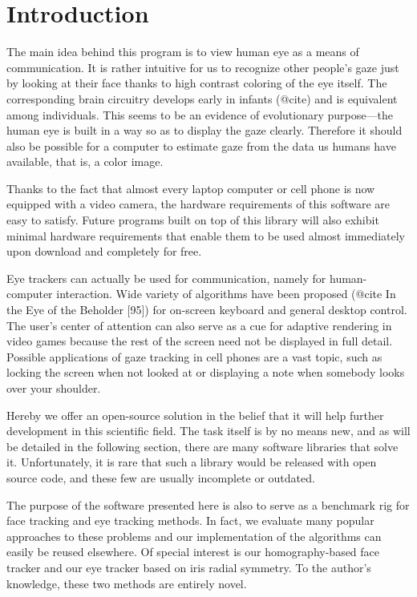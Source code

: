 \chapter{Introduction}

The main idea behind this program is to view human eye as a means of communication.
It is rather intuitive for us to recognize other people's gaze just by looking at their face thanks to high contrast coloring of the eye itself.
The corresponding brain circuitry develops early in infants (@cite) and is equivalent among individuals.
This seems to be an evidence of evolutionary purpose---the human eye is built in a way so as to display the gaze clearly.
Therefore it should also be possible for a computer to estimate gaze from the data us humans have available, that is, a color image.

Thanks to the fact that almost every laptop computer or cell phone is now equipped with a video camera, the hardware requirements of this software are easy to satisfy.
Future programs built on top of this library will also exhibit minimal hardware requirements that enable them to be used almost immediately upon download and completely for free.

Eye trackers can actually be used for communication, namely for human-computer interaction.
Wide variety of algorithms have been proposed (@cite In the Eye of the Beholder [95]) for on-screen keyboard and general desktop control.
The user's center of attention can also serve as a cue for adaptive rendering in video games because the rest of the screen need not be displayed in full detail.
Possible applications of gaze tracking in cell phones are a vast topic, such as locking the screen when not looked at or displaying a note when somebody looks over your shoulder.

Hereby we offer an open-source solution in the belief that it will help further development in this scientific field.
The task itself is by no means new, and as will be detailed in the following section, there are many software libraries that solve it.
Unfortunately, it is rare that such a library would be released with open source code, and these few are usually incomplete or outdated.

The purpose of the software presented here is also to serve as a benchmark rig for face tracking and eye tracking methods.
In fact, we evaluate many popular approaches to these problems and our implementation of the algorithms can easily be reused elsewhere.
Of special interest is our homography-based face tracker and our eye tracker based on iris radial symmetry.
To the author's knowledge, these two methods are entirely novel.

